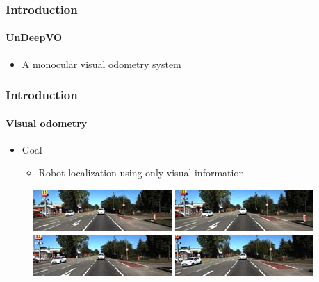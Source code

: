 \begin{frame}
    \frametitle{Introduction}
    \framesubtitle{UnDeepVO}
    \begin{itemize}
        \item A monocular visual odometry system
    \end{itemize}
\end{frame}

\begin{frame}
    \frametitle{Introduction}
    \framesubtitle{Visual odometry}
    \begin{itemize}
        \item Goal
        \begin{itemize}
            \item Robot localization using only visual information
        \end{itemize}
    \end{itemize}
    \begin{figure}
        \includegraphics[scale=0.8]{images/road1.png}
        \includegraphics[scale=0.8]{images/road2.png}
        \includegraphics[scale=0.8]{images/road3.png}
        \includegraphics[scale=0.8]{images/road4.png}
    \end{figure}
\end{frame}

